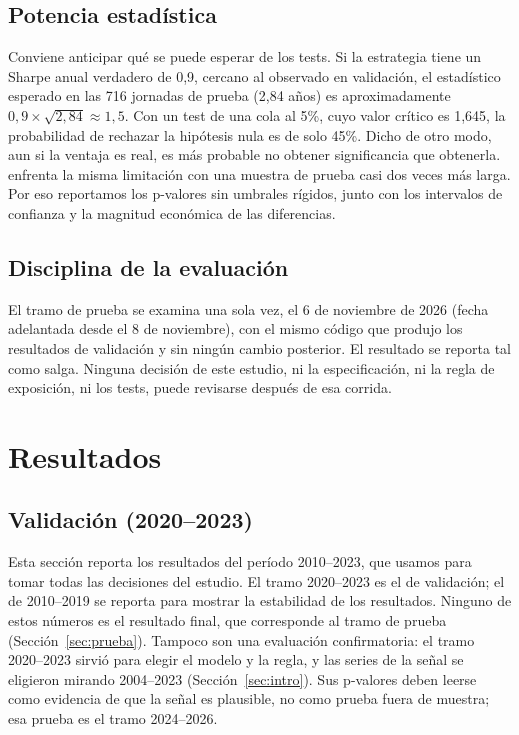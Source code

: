 \documentclass[11pt,a4paper]{article}
\begin{document}
\subsection{Potencia estadística}

Conviene anticipar qué se puede esperar de los tests. Si la estrategia tiene un Sharpe anual verdadero de 0,9, cercano al observado en validación, el estadístico esperado en las 716 jornadas de prueba (2,84 años) es aproximadamente \(0{,}9\times\sqrt{2{,}84}\approx1{,}5\). Con un test de una cola al 5\%, cuyo valor crítico es 1,645, la probabilidad de rechazar la hipótesis nula es de solo 45\%. Dicho de otro modo, aun si la ventaja es real, es más probable no obtener significancia que obtenerla. \citet{gonzalez2026} enfrenta la misma limitación con una muestra de prueba casi dos veces más larga. Por eso reportamos los p-valores sin umbrales rígidos, junto con los intervalos de confianza y la magnitud económica de las diferencias.

\subsection{Disciplina de la evaluación}

El tramo de prueba se examina una sola vez, el 6 de noviembre de 2026 (fecha adelantada desde el 8 de noviembre), con el mismo código que produjo los resultados de validación y sin ningún cambio posterior. El resultado se reporta tal como salga. Ninguna decisión de este estudio, ni la especificación, ni la regla de exposición, ni los tests, puede revisarse después de esa corrida.

\newpage
\section{Resultados}\label{sec:resultados}

\subsection{Validación (2020--2023)}

Esta sección reporta los resultados del período 2010--2023, que usamos para tomar todas las decisiones del estudio. El tramo 2020--2023 es el de validación; el de 2010--2019 se reporta para mostrar la estabilidad de los resultados. Ninguno de estos números es el resultado final, que corresponde al tramo de prueba (Sección~\ref{sec:prueba}). Tampoco son una evaluación confirmatoria: el tramo 2020--2023 sirvió para elegir el modelo y la regla, y las series de la señal se eligieron mirando 2004--2023 (Sección~\ref{sec:intro}). Sus p-valores deben leerse como evidencia de que la señal es plausible, no como prueba fuera de muestra; esa prueba es el tramo 2024--2026.
\end{document}

